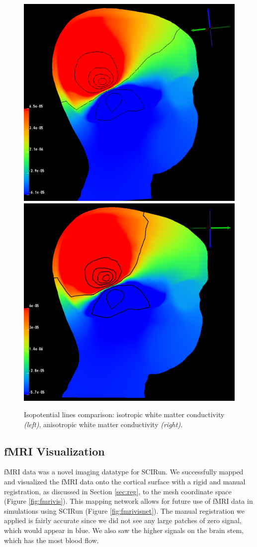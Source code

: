 \begin{figure}[H]
\begin{center}
\includegraphics[width=.49\textwidth]{Figures/iso_isolines}
\includegraphics[width = .49\textwidth]{Figures/aniso_isolines}
\caption{Isopotential lines comparison: isotropic white matter conductivity \textit{(left)}, anisotropic white matter conductivity \textit{(right)}.}
\label{fig:isolines}
\end{center}
\end{figure}

\subsection{fMRI Visualization}

fMRI data was a novel imaging datatype for SCIRun. We successfully mapped and visualized the fMRI data onto the cortical surface with a rigid and manual registration, as discussed in Section \ref{sec:reg}, to the mesh coordinate space (Figure \ref{fig:fmrivis}). This mapping network allows for future use of fMRI data in simulations using SCIRun (Figure \ref{fig:fmrivisnet}). The manual registration we applied is fairly accurate since we did not see any large patches of zero signal, which would appear in blue. We also saw the higher signals on the brain stem, which has the most blood flow.

